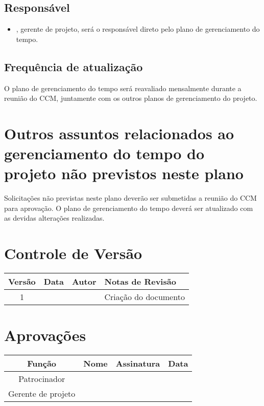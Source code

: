 \subsection{Responsável}

\begin{itemize}
	\item \projectManagerName, gerente de projeto, será o responsável direto pelo plano de gerenciamento do tempo.
\end{itemize}

\subsection{Frequência de atualização}

O plano de gerenciamento do tempo será reavaliado mensalmente durante a reunião do CCM, juntamente com os outros planos de gerenciamento do projeto.

\section{Outros assuntos relacionados ao gerenciamento do tempo do projeto não previstos neste plano}

Solicitações não previstas neste plano deverão ser submetidas a reunião do CCM para aprovação. O plano de gerenciamento do tempo deverá ser atualizado com as devidas alterações realizadas.

\section{Controle de Versão}

\begin{table}[H]
	\begin{tabularx}{\textwidth}{| c | c | X | X |}
		\hline
		\textbf{Versão} & \textbf{Data} & \textbf{Autor}      & \textbf{Notas de Revisão} \\
		\hline
		1                &               & \projectManagerName & Criação do documento     \\
		\hline
	\end{tabularx}
	\centering
\end{table}

\section{Aprovações}

\begin{table}[H]
	\begin{tabularx}{\textwidth}{| c | c | X | c |}
		\hline
		\textbf{Função}  & \textbf{Nome}       & \textbf{Assinatura}      & \textbf{Data} \\
		\hline
		Patrocinador       & \projectSponsorName & \projectSponsorSignature &               \\
		\hline
		Gerente de projeto & \projectManagerName & \projectManagerSignature &               \\
		\hline
	\end{tabularx}
	\centering
\end{table}